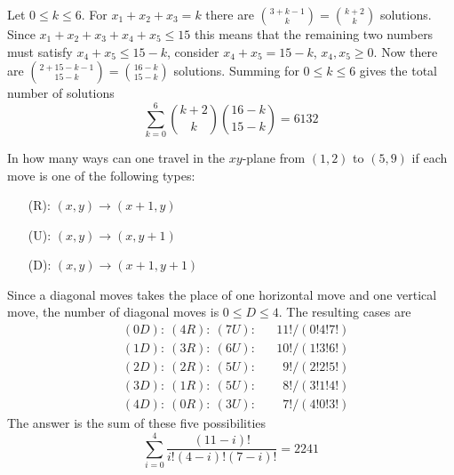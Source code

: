 \documentclass[a4paper, english, 12pt]{article} %
\begin{document}
\begin{answer}
  Let $0 \leq k \leq 6$. For $x_1 + x_2 + x_3 = k$ there are $\binom{3 + k -
    1}{k } = \binom{k+2}{k}$ solutions. Since $x_1 + x_2 + x_3 + x_4 + x_5 \leq
  15$ this means that the remaining two numbers must satisfy $x_4 + x_5 \leq 15
  - k$, consider $x_4 + x_5 = 15 - k$, $x_4, x_5 \geq 0$. Now there are
  $\binom{2 + 15 - k - 1}{15 - k} = \binom{16 - k}{15 - k}$ solutions. Summing
  for $0 \leq k \leq 6$ gives the total number of solutions
  \begin{equation*}
    \sum_{k = 0}^{6} \binom{k + 2}{k} \binom{16 - k}{15 - k} = 6132
  \end{equation*}
\end{answer}

\begin{problem}[28]
  \begin{subproblem}[2]
    In how many ways can one travel in the $xy$-plane from $(1,2)$ to $(5, 9)$
    if each move is one of the following types:
    \begin{enumerate}
      \item[(R):] $(x, y) \to (x + 1, y    )$ 
      \item[(U):] $(x, y) \to (x    , y + 1)$
      \item[(D):] $(x, y) \to (x + 1, y + 1)$
    \end{enumerate} 
  \end{subproblem}
\end{problem}

\begin{answer}
  Since a diagonal moves takes the place of one horizontal move and one vertical
  move, the number of diagonal moves is $0 \leq D \leq 4$. The resulting cases
  are
  \begin{align*}
    &(0 D): \ (4R): \ (7U):  && 11!/(0!4!7!) \\
    &(1 D): \ (3R): \ (6U):  && 10!/(1!3!6!) \\  
    &(2 D): \ (2R): \ (5U):  && \phantom{1}9!/(2!2!5!) \\ 
    &(3 D): \ (1R): \ (5U):  && \phantom{1}8!/(3!1!4!) \\
    &(4 D): \ (0R): \ (3U):  && \phantom{1}7!/(4!0!3!) 
  \end{align*}
  The answer is the sum of these five possibilities
  \begin{equation*}
    \sum_{i=0}^{4} \frac{(11-i)!}{i!(4-i)!(7-i)!} = 2241
  \end{equation*}
\end{answer}
\end{document}
